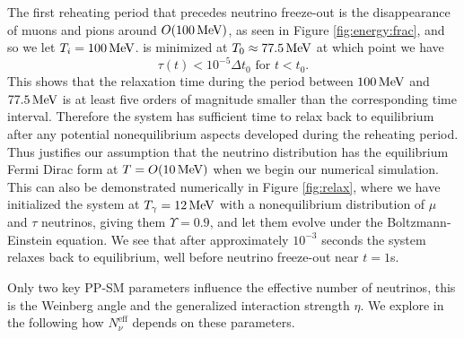  The first reheating period that precedes neutrino freeze-out is the disappearance of muons and pions around $O(100\text{\,MeV})$, as seen in Figure \ref{fig:energy:frac}, and so we let $T_i=100\text{\,MeV}$.  is minimized at $T_0\approx 77.5\text{\,MeV}$ at which point we have 
\begin{equation}
\tau(t)<10^{-5} \Delta t_0 \text{ for } t<t_0.
\end{equation}
This shows that the relaxation time during the period between $100\text{\,MeV}$ and $77.5\text{\,MeV}$ is at least five orders of magnitude smaller than the corresponding time interval. Therefore the system has sufficient time to relax back to equilibrium after any potential nonequilibrium aspects developed during the reheating period. Thus justifies our assumption that the neutrino distribution has the equilibrium Fermi Dirac form at $T=O(10 \text{\,MeV})$ when we begin our numerical simulation. This can also be demonstrated numerically in Figure \ref{fig:relax}, where we have initialized the system at $T_\gamma=12\text{\,MeV}$ with a nonequilibrium distribution of $\mu$ and $\tau$ neutrinos, giving them $\Upsilon=0.9$, and let them evolve under the Boltzmann-Einstein equation. We see that after approximately $10^{-3}$ seconds the system relaxes back to equilibrium, well before neutrino freeze-out near $t=1$s.



Only two key PP-SM parameters influence the effective number of neutrinos, this is the Weinberg angle and the generalized interaction strength $\eta$. We explore in the following how $N_\nu^{\mathrm{eff}}$ depends on these parameters.

